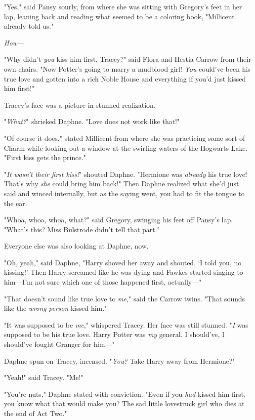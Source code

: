 "Yes," said Pansy sourly, from where she was sitting with Gregory's feet in her 
lap, leaning back and reading what seemed to be a coloring book, "Millicent 
already told us."

\emph{How---}

"Why didn't \emph{you} kiss him first, Tracey?" said Flora and Hestia Carrow 
from their own chairs. "Now Potter's going to marry a mudblood girl! \emph{You} 
could've been his true love and gotten into a rich Noble House and everything 
if you'd just kissed him first!"

Tracey's face was a picture in stunned realization.

"\emph{What?}" shrieked Daphne. "Love does not work like that!"

"Of course it does," stated Millicent from where she was practicing some sort 
of Charm while looking out a window at the swirling waters of the Hogwarts 
Lake. "First kiss gets the prince."

"\emph{It wasn't their first kiss!}" shouted Daphne. "Hermione was 
\emph{already} his true love! That's why \emph{she} could bring him back!" Then 
Daphne realized what she'd just said and winced internally, but as the saying 
went, you had to fit the tongue to the ear.

"Whoa, whoa, whoa, what?" said Gregory, swinging his feet off Pansy's lap. 
"What's this? Miss Bulstrode didn't tell that part."

Everyone else was also looking at Daphne, now.

"Oh, yeah," said Daphne, "Harry shoved her away and shouted, `I told you, no 
kissing!' Then Harry screamed like he was dying and Fawkes started singing to 
him---I'm not sure which one of those happened first, actually---"

"That doesn't sound like true love to \emph{me,}" said the Carrow twins. "That 
sounds like the \emph{wrong person} kissed him."

"It was supposed to be \emph{me}," whispered Tracey. Her face was still 
stunned. "\emph{I} was supposed to be his true love. Harry Potter was \emph{my} 
general. I should've, I should've fought Granger for him---"

Daphne spun on Tracey, incensed. "\emph{You?} Take Harry away from Hermione?"

"Yeah!" said Tracey. "Me!"

"You're nuts," Daphne stated with conviction. "Even if you \emph{had} kissed 
him first, you know what that would make you? The sad little lovestruck girl 
who dies at the end of Act Two."

